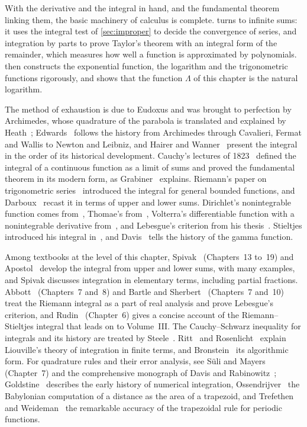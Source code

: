 \bigskip
With the derivative and the integral in hand, and the fundamental theorem linking them, the basic machinery of calculus is complete.  turns to infinite sums: it uses the integral test of \cref{sec:improper} to decide the convergence of series, and integration by parts to prove Taylor's theorem with an integral form of the remainder, which measures how well a function is approximated by polynomials.  then constructs the exponential function, the logarithm and the trigonometric functions rigorously, and shows that the function $\Lambda$ of this chapter is the natural logarithm.

\chapternotes

The method of exhaustion is due to Eudoxus and was brought to perfection by Archimedes, whose quadrature of the parabola is translated and explained by Heath~\cite{heath1897archimedes}; Edwards~\cite{edwards1979} follows the history from Archimedes through Cavalieri, Fermat and Wallis to Newton and Leibniz, and Hairer and Wanner~\cite{hairer1996analysis} present the integral in the order of its historical development. Cauchy's lectures of 1823~\cite{cauchy1823} defined the integral of a continuous function as a limit of sums and proved the fundamental theorem in its modern form, as Grabiner~\cite{grabiner1981} explains. Riemann's paper on trigonometric series~\cite{riemann1867} introduced the integral for general bounded functions, and Darboux~\cite{darboux1875} recast it in terms of upper and lower sums. Dirichlet's nonintegrable function comes from~\cite{dirichlet1829}, Thomae's from~\cite{thomae1875}, Volterra's differentiable function with a nonintegrable derivative from~\cite{volterra1881}, and Lebesgue's criterion from his thesis~\cite{lebesgue1902}. Stieltjes introduced his integral in~\cite{stieltjes1894}, and Davis~\cite{davis1959gamma} tells the history of the gamma function.

Among textbooks at the level of this chapter, Spivak~\cite{spivak2008calculus} (Chapters~13 to~19) and Apostol~\cite{apostol1967calculus} develop the integral from upper and lower sums, with many examples, and Spivak discusses integration in elementary terms, including partial fractions. Abbott~\cite{abbott2015} (Chapters~7 and~8) and Bartle and Sherbert~\cite{bartle2011} (Chapters~7 and~10) treat the Riemann integral as a part of real analysis and prove Lebesgue's criterion, and Rudin~\cite{rudin1976} (Chapter~6) gives a concise account of the Riemann--Stieltjes integral that leads on to Volume~III. The Cauchy--Schwarz inequality for integrals and its history are treated by Steele~\cite{steele2004}. Ritt~\cite{ritt1948} and Rosenlicht~\cite{rosenlicht1972} explain Liouville's theory of integration in finite terms, and Bronstein~\cite{bronstein2005} its algorithmic form. For quadrature rules and their error analysis, see S\"uli and Mayers~\cite{suli2003} (Chapter~7) and the comprehensive monograph of Davis and Rabinowitz~\cite{davis1984}; Goldstine~\cite{goldstine1977} describes the early history of numerical integration, Ossendrijver~\cite{ossendrijver2016} the Babylonian computation of a distance as the area of a trapezoid, and Trefethen and Weideman~\cite{trefethen2014} the remarkable accuracy of the trapezoidal rule for periodic functions.

\chapterreferences
